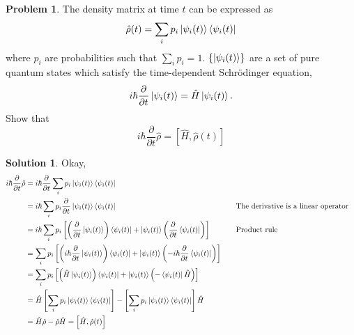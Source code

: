 \documentclass[10pt]{article}
\theoremstyle{definition}
\newtheorem{problem}{Problem}
\newtheorem{soln}{Solution}
\newcommand{\justif}[2]{&{#1}&\text{#2}}
\newcommand{\pdiff}[2][]{{\frac{\partial^{#1}}{\partial {{#2}^{#1}}}}}
\begin{document}
\begin{problem}
The density matrix at time $t$ can be expressed as
$$\hat{\rho}(t)=\sum_ip_i\ket{\psi_i(t)}\bra{\psi_i(t)}$$
where $p_i$ are probabilities such that $\sum_ip_i=1$.
$\left\{\ket{\psi_i(t)}\right\}$ are a set of pure quantum states which satisfy the time-dependent Schr\"odinger equation,
$$i\hbar\frac{\partial}{\partial t}\ket{\psi_i(t)}=\hat{H}\ket{\psi_i(t)}.$$
Show that
$$i\hbar \frac{\partial}{\partial t}\hat{\rho}=\left[\hat{H},\hat{\rho}(t)\right]$$
\end{problem}
\begin{soln}
  Okay,
  \begin{align*}
    i\hbar \frac{\partial}{\partial t}\hat{\rho} & =i\hbar \pdiff{t}\sum_ip_i\ket{\psi_i(t)}\bra{\psi_i(t)}                                                                                           \\
                                                 & =i\hbar \sum_ip_i\pdiff{t}\ket{\psi_i(t)}\bra{\psi_i(t)}\justif{\quad}{The derivative is a linear operator}                                        \\
                                                 & =i\hbar \sum_ip_i\left[\left(\pdiff{t}\ket{\psi_i(t)}\right)\bra{\psi_i(t)}+\ket{\psi_i(t)}\left(\pdiff{t}\bra{\psi_i(t)}\right)\right]\justif{\quad}{Product rule} \\
                                                 & = \sum_ip_i\left[\left(i\hbar\pdiff{t}\ket{\psi_i(t)}\right)\bra{\psi_i(t)}+\ket{\psi_i(t)}\left(-i\hbar\pdiff{t}\bra{\psi_i(t)}\right)\right]     \\
                                                 & = \sum_ip_i\left[\left(\hat{H}\ket{\psi_i(t)}\right)\bra{\psi_i(t)}+\ket{\psi_i(t)}\left(-\bra{\psi_i(t)}\hat{H}\right)\right]                     \\
                                                 & =\hat{H}\left[\sum_ip_i\ket{\psi_i(t)}\bra{\psi_i(t)}\right]-\left[\sum_ip_i\ket{\psi_i(t)}\bra{\psi_i(t)}\right]\hat{H}                           \\
                                                 & =\hat{H}\hat{\rho}-\hat{\rho}\hat{H}=\left[\hat{H},\hat{\rho}(t)\right]
  \end{align*}
\end{soln}
\end{document}
